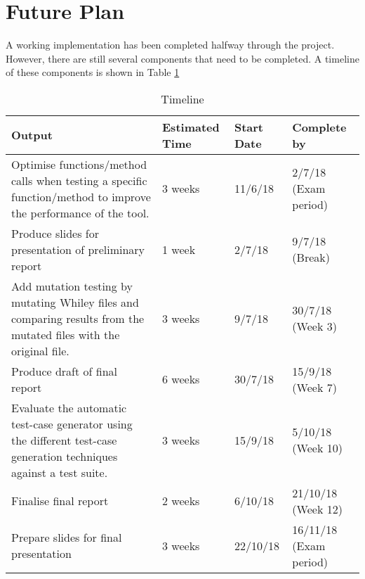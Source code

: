 \section{Future Plan}\label{section:future}


A working implementation has been completed halfway through the project. However, there are still several components that need to be completed.
A timeline of these components is shown in Table \ref{table:timeline}

\begin{table}[H]
	  \centering
\begin{tabular}{ |p{10cm}|p{2cm}|p{2cm}|p{2cm}| }
\hline
\textbf{Output} & \textbf{Estimated Time} & \textbf{Start Date} & \textbf{Complete by}\\
\hline
Optimise functions/method calls when testing a specific function/method to improve the performance of the tool. & 3 weeks & 11/6/18 & 2/7/18 (Exam period) \\
\hline
Produce slides for presentation of preliminary report & 1 week & 2/7/18 & 9/7/18 (Break)\\
\hline
Add mutation testing by mutating Whiley files and comparing results from the mutated files with the original file. & 3 weeks & 9/7/18 & 30/7/18 (Week 3)\\
\hline
Produce draft of final report & 6 weeks & 30/7/18 & 15/9/18 (Week 7)\\
\hline
Evaluate the automatic test-case generator using the different test-case generation techniques against a test suite. & 3 weeks & 15/9/18 & 5/10/18 (Week 10) \\
\hline
Finalise final report & 2 weeks & 6/10/18 & 21/10/18 (Week 12) \\
\hline
Prepare slides for final presentation & 3 weeks & 22/10/18 & 16/11/18 (Exam period)\\
\hline
\end{tabular}

\caption{Timeline}
\label{table:timeline}

\end{table}

